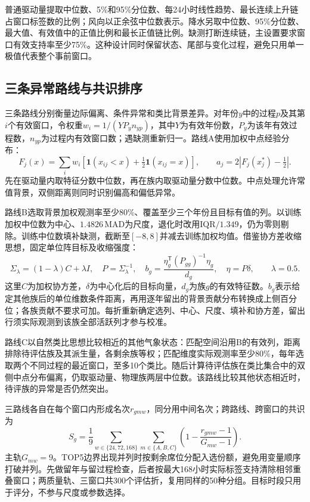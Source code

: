 普通驱动量提取中位数、5\%和95\%分位数、每24小时线性趋势、最长连续上升链占窗口标签数的比例；风向以正余弦中位数表示。降水另取中位数、95\%分位数、最大值、有效值中的正值比例和最长正值链比例。缺测打断连续链，主设置要求窗口有效支持率至少75\%。这种设计同时保留状态、尾部与变化过程，避免只用单一极值代表整个事前窗口。

\subsection{三条异常路线与共识排序}

三条路线分别衡量边际偏离、条件异常和类比背景差异。对年份$y$中的过程$p$及其第$i$个有效窗口，令权重$w_i=1/(Y P_y n_{yp})$，其中$Y$为有效年份数，$P_y$为该年有效过程数，$n_{yp}$为过程内有效窗口数；遇缺测重新归一。路线A使用加权中点经验分布：
\begin{equation}
 F_j(x)=\sum_i w_i\!\left[\mathbf1(x_{ij}<x)+\tfrac12\mathbf1(x_{ij}=x)\right],
 \qquad a_j=2\left|F_j(x_j^*)-\tfrac12\right|.
 \label{q1-eq-ecdf}
\end{equation}
先在驱动量内取特征分数中位数，再在族内取驱动量分数中位数。中点处理允许常值背景，双侧距离则同时识别偏高和偏低异常。

路线B选取背景加权观测率至少80\%、覆盖至少三个年份且目标有值的列。以训练加权中位数为中心、$1.4826\,\mathrm{MAD}$为尺度，退化时改用$\mathrm{IQR}/1.349$，仍为零则剔除。训练中位数填补缺测，截断至$[-8,8]$并减去训练加权均值。借鉴协方差收缩思想\cite{q1-shrinkage}，固定单位阵目标及收缩强度：
\begin{equation}
 \Sigma_\lambda=(1-\lambda)C+\lambda I,\quad P=\Sigma_\lambda^{-1},\quad
 b_g=\frac{\eta_g^{\mathsf T}(P_{gg})^{-1}\eta_g}{d_g},\quad
 \eta=P\delta,\qquad\lambda=0.5.
 \label{q1-eq-conditional}
\end{equation}
这里$C$为加权协方差，$\delta$为中心化后的目标向量，$d_g$为族$g$的有效特征数。$b_g$表示给定其他族后的单位维数条件距离，再用逐年留出的背景贡献分布转换成上侧百分位；各族贡献不要求可加。每折重新确定选列、中心、尺度、填补和协方差，留出行须实际观测到该族全部活跃列才参与校准。

路线C以自然类比思想\cite{q1-analog}比较相近的其他气象状态：匹配空间沿用B的有效列，距离排除待评估族及其派生量，各剩余族等权；匹配维度实际观测率至少80\%，每年选取两个不同过程的最近窗口，至多10个类比。随后计算待评估族在类比集合中的双侧中点分布偏离，仍取驱动量、物理族两层中位数。该路线比较其他状态相近时，待评族的异常是否仍然突出。

三路线各自在每个窗口内形成名次$r_{gmw}$，同分用中间名次；跨路线、跨窗口的共识为
\begin{equation}
 S_g=\frac{1}{9}\sum_{w\in\{24,72,168\}}\sum_{m\in\{A,B,C\}}
 \left(1-\frac{r_{gmw}-1}{G_{mw}-1}\right).
 \label{q1-eq-consensus}
\end{equation}
主轨$G_{mw}=9$。TOP5边界出现并列时按剩余席位分配入选份额，避免用变量顺序打破并列。先做留年与留过程检查，后者按最大168小时实际标签支持清除相邻重叠窗口；两质量轨、三窗口共300个评估折，复用同样的50种分组。目标时段只用于评分，不参与尺度或参数选择。

